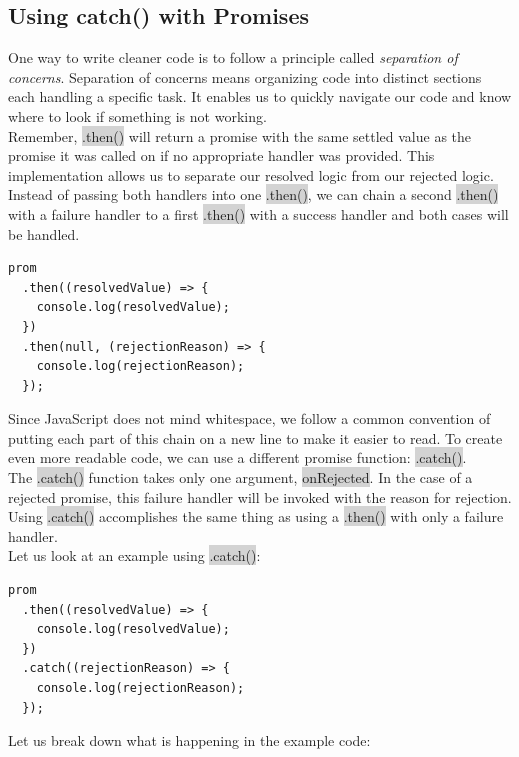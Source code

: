 \documentclass[11pt]{article}
\begin{document}
\subsection{Using catch() with Promises}
One way to write cleaner code is to follow a principle called \textit{separation of concerns}. Separation of concerns means organizing code into distinct sections each handling a specific task. It enables us to quickly navigate our code and know where to look if something is not working. \\
\newline
Remember, \colorbox{lightgray}{.then()} will return a promise with the same settled value as the promise it was called on if no appropriate handler was provided. This implementation allows us to separate our resolved logic from our rejected logic. Instead of passing both handlers into one \colorbox{lightgray}{.then()}, we can chain a second \colorbox{lightgray}{.then()} with a failure handler to a first \colorbox{lightgray}{.then()} with a success handler and both cases will be handled.
\begin{lstlisting}
prom
  .then((resolvedValue) => {
    console.log(resolvedValue);
  })
  .then(null, (rejectionReason) => {
    console.log(rejectionReason);
  });
\end{lstlisting}
Since JavaScript does not mind whitespace, we follow a common convention of putting each part of this chain on a new line to make it easier to read. To create even more readable code, we can use a different promise function: \colorbox{lightgray}{.catch()}. \\
\newline
The \colorbox{lightgray}{.catch()} function takes only one argument, \colorbox{lightgray}{onRejected}. In the case of a rejected promise, this failure handler will be invoked with the reason for rejection. Using \colorbox{lightgray}{.catch()} accomplishes the same thing as using a \colorbox{lightgray}{.then()} with only a failure handler. \\
\newline
Let us look at an example using \colorbox{lightgray}{.catch()}:
\begin{lstlisting}
prom
  .then((resolvedValue) => {
    console.log(resolvedValue);
  })
  .catch((rejectionReason) => {
    console.log(rejectionReason);
  });
\end{lstlisting}
Let us break down what is happening in the example code:
\end{document}
